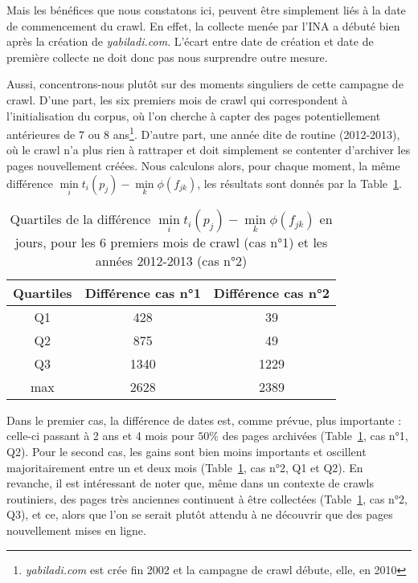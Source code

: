 \documentclass[symmetric,justified,marginals=raggedouter]{tufte-book}
\begin{document}
\noindent Mais les bénéfices que nous constatons ici, peuvent être simplement liés à la date de commencement du crawl. En effet, la collecte menée par l'INA a débuté bien après la création de \textit{yabiladi.com}. L'écart entre date de création et date de première collecte ne doit donc pas nous surprendre outre mesure.

Aussi, concentrons-nous plutôt sur des moments singuliers de cette campagne de crawl. D'une part, les six premiers mois de crawl qui correspondent à l'initialisation du corpus, où l'on cherche à capter des pages potentiellement antérieures de 7 ou 8 ans\footnote{\RaggedOuter \textit{yabiladi.com} est crée fin 2002 et la campagne de crawl débute, elle, en 2010}. D'autre part, une année dite de routine (2012-2013), où le crawl n'a plus rien à rattraper et doit simplement se contenter d'archiver les pages nouvellement créées. Nous calculons alors, pour chaque moment, la même différence $\min\limits_{i} t_i(p_j) - \min\limits_{k} \phi(f_{jk})$, les résultats sont donnés par la Table~\ref{tab:quartiles_2}.

\begin{table}
\centering
\hspace{2em}%
  \label{tab:quartiles_2}
  \begin{tabular}{ccc}
    \toprule
    Quartiles&Différence cas n°1&Différence cas n°2\\
    \midrule
    Q1 & 428 & 39\\
    Q2 & 875 & 49\\
    Q3 & 1340 & 1229\\
    max & 2628 & 2389\\      
  \bottomrule
\end{tabular}
  \bigskip
  \caption{Quartiles de la différence $\min\limits_{i} t_i(p_j) - \min\limits_{k} \phi(f_{jk})$ en jours, pour les 6 premiers mois de crawl (cas n°1) et les années 2012-2013 (cas n°2)}
\end{table} 

\noindent Dans le premier cas, la différence de dates est, comme prévue, plus importante : celle-ci passant à 2 ans et 4 mois pour $50\%$ des pages archivées (Table~\ref{tab:quartiles_2}, cas n°1, Q2). Pour le second cas, les gains sont bien moins importants et oscillent majoritairement entre un et deux mois (Table~\ref{tab:quartiles_2}, cas n°2, Q1 et Q2). En revanche, il est intéressant de noter que, même dans un contexte de crawls routiniers, des pages très anciennes continuent à être collectées (Table~\ref{tab:quartiles_2}, cas n°2, Q3), et ce, alors que l'on se serait plutôt attendu à ne découvrir que des pages nouvellement mises en ligne.
\end{document}
